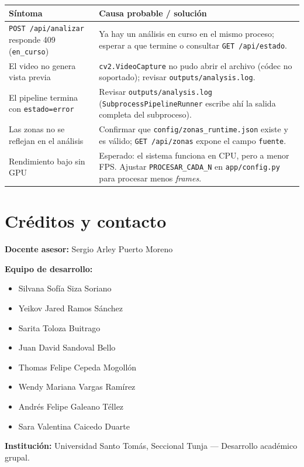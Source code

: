 \documentclass[11pt,a4paper]{report}
\begin{document}
\begin{longtable}{>{\raggedright\arraybackslash}p{5.2cm} >{\raggedright\arraybackslash}p{8.4cm}}
\toprule
\rowcolor{rvCodeBg}\textbf{Síntoma} & \textbf{Causa probable / solución} \\
\midrule
\endhead
\texttt{POST /api/analizar} responde 409 (\texttt{en\_curso}) & Ya hay un análisis en curso en el
mismo proceso; esperar a que termine o consultar \texttt{GET /api/estado}. \\
El video no genera vista previa & \texttt{cv2.VideoCapture} no pudo abrir el archivo (códec no
soportado); revisar \texttt{outputs/analysis.log}. \\
El pipeline termina con \texttt{estado=error} & Revisar \texttt{outputs/analysis.log}
(\texttt{SubprocessPipelineRunner} escribe ahí la salida completa del subproceso). \\
Las zonas no se reflejan en el análisis & Confirmar que \texttt{config/zonas\_runtime.json}
existe y es válido; \texttt{GET /api/zonas} expone el campo \texttt{fuente}. \\
Rendimiento bajo sin GPU & Esperado: el sistema funciona en CPU, pero a menor FPS. Ajustar
\texttt{PROCESAR\_CADA\_N} en \texttt{app/config.py} para procesar menos \textit{frames}. \\
\bottomrule
\end{longtable}

\chapter{Créditos y contacto}

\textbf{Docente asesor:} Sergio Arley Puerto Moreno

\textbf{Equipo de desarrollo:}

\begin{itemize}
  \item Silvana Sofía Siza Soriano
  \item Yeikov Jared Ramos Sánchez
  \item Sarita Toloza Buitrago
  \item Juan David Sandoval Bello
  \item Thomas Felipe Cepeda Mogollón
  \item Wendy Mariana Vargas Ramírez
  \item Andrés Felipe Galeano Téllez
  \item Sara Valentina Caicedo Duarte
\end{itemize}

\textbf{Institución:} Universidad Santo Tomás, Seccional Tunja --- Desarrollo académico grupal.
\end{document}
